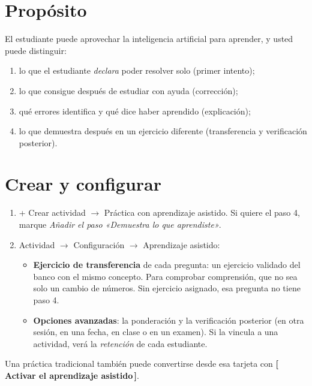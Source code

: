 \documentclass[11pt,a4paper,oneside]{book}
\newcommand{\boton}[1]{\textsf{\textbf{[\,#1\,]}}}
\newcommand{\ruta}[1]{\textsf{#1}}
\begin{document}
\section{Propósito}
El estudiante puede aprovechar la inteligencia artificial para aprender, y usted puede distinguir:
\begin{enumerate}
  \item lo que el estudiante \emph{declara} poder resolver solo (primer intento);
  \item lo que consigue después de estudiar con ayuda (corrección);
  \item qué errores identifica y qué dice haber aprendido (explicación);
  \item lo que demuestra después en un ejercicio diferente (transferencia y verificación posterior).
\end{enumerate}

\section{Crear y configurar}
\begin{enumerate}
  \item \ruta{+ Crear actividad $\rightarrow$ Práctica con aprendizaje asistido}. Si quiere el paso 4, marque
        \emph{Añadir el paso «Demuestra lo que aprendiste»}.
  \item \ruta{Actividad $\rightarrow$ Configuración $\rightarrow$ Aprendizaje asistido}:
    \begin{itemize}
      \item \textbf{Ejercicio de transferencia} de cada pregunta: un ejercicio validado del banco con el mismo concepto.
            Para comprobar comprensión, que no sea solo un cambio de números. Sin ejercicio asignado, esa pregunta no
            tiene paso 4.
      \item \textbf{Opciones avanzadas}: la ponderación y la verificación posterior (en otra sesión, en una fecha, en
            clase o en un examen). Si la vincula a una actividad, verá la \emph{retención} de cada estudiante.
    \end{itemize}
\end{enumerate}
Una práctica tradicional también puede convertirse desde esa tarjeta con \boton{Activar el aprendizaje asistido}.
\end{document}
